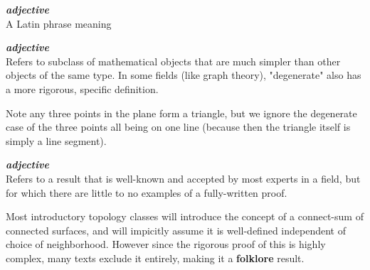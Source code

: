 \documentclass[12pt,x11names]{article}
\begin{document}
\begin{definition}[De Facto]
    \textbf{\textit{adjective}}\\
    A Latin phrase meaning 
    
\end{definition}

\begin{definition}[Deep]
    
\end{definition}

\begin{definition}[Degenerate]
\textbf{\textit{adjective}}\\
Refers to subclass of mathematical objects that are much simpler than other objects of the same type. In some fields (like graph theory), "degenerate" also has a more rigorous, specific definition.
\end{definition}

\begin{example}
    Note any three points in the plane form a triangle, but we ignore the degenerate case of the three points all being on one line (because then the triangle itself is simply a line segment).
\end{example}



\begin{definition}[Elegant]
    
\end{definition}


\begin{definition}[Elementary]
\end{definition}


\begin{definition}[Epsilon]
    
\end{definition}

\begin{definition}[Folklore]
    \textbf{\textit{adjective}}\\
    Refers to a result that is well-known and accepted by most experts in a field, but for which there are little to no examples of a fully-written proof.
\end{definition}

\begin{example}
    Most introductory topology classes will introduce the concept of a connect-sum of connected surfaces, and will impicitly assume it is well-defined independent of choice of neighborhood. However since the rigorous proof of this is highly complex, many texts exclude it entirely, making it a \textbf{folklore} result.
\end{example}
\end{document}
